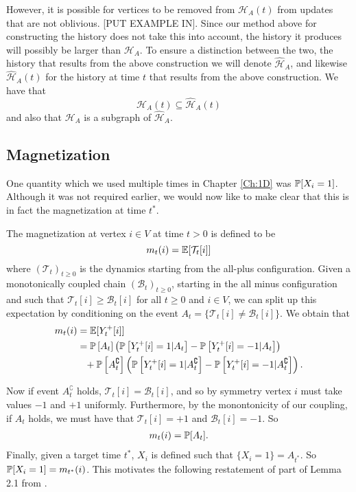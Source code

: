 However, it is possible for vertices to be removed from $\mathcal{H}_A(t)$ from updates that are not oblivious. [PUT EXAMPLE IN]. Since our method above for constructing the history does not take this into account, the history it produces will possibly be larger than $\mathcal{H}_A$. To ensure a distinction between the two, the history that results from the above construction we will denote $\hat{\mathcal{H}}_A$, and likewise $\hat{\mathcal{H}}_A(t)$ for the history at time $t$ that results from the above construction. We have that
\begin{equation}
	\mathcal{H}_A(t) \subseteq \hat{\mathcal{H}}_A(t)
\end{equation}
and also that $\mathcal{H}_A$ is a subgraph of $\hat{\mathcal{H}}_A$.

\subsection{Magnetization}
One quantity which we used multiple times in Chapter \ref{Ch:1D} was $\mathbb{P}[X_i = 1]$. Although it was not required earlier, we would now like to make clear that this is in fact the magnetization at time $t^*$. 

The magnetization at vertex $i \in V$ at time $t > 0$ is defined to be
\begin{equation}
	m_t(i) = \mathbb{E}[\mathcal{T}_t[i]]
\end{equation}
where $(\mathcal{T}_t)_{t \geq 0}$ is the dynamics starting from the all-plus configuration. %
Given a monotonically coupled chain $(\mathcal{B}_t)_{t\geq0}$, starting in the all minus configuration and such that $\mathcal{T}_t[i] \geq \mathcal{B}_t[i]$ for all $t\geq 0$ and $i \in V$, we can split up this expectation by conditioning on the event $A_t = \{\mathcal{T}_t[i] \neq \mathcal{B}_t[i]\}$. We obtain that
\begin{align}
	m_t(i) &= \mathbb{E}[Y_t^+[i]]\\
	&= \mathbb{P}\left[A_t\right] \left(\mathbb{P}\left[Y_t^+[i] = 1 | A_t\right] - \mathbb{P}\left[Y_t^+[i] = -1|A_t\right]\right)  \\
	&\phantom{= } + \mathbb{P}\left[A_t^\complement\right] \left( \mathbb{P}\left[Y_t^+[i] = 1 |A_t^\complement\right] - \mathbb{P}\left[Y_t^+[i] = -1|A_t^\complement\right] \right). \notag
\end{align}

Now if event $A_t^\complement$ holds, $\mathcal{T}_t[i] = \mathcal{B}_t[i]$, and so by symmetry vertex $i$ must take values $-1$ and $+1$ uniformly. Furthermore, by the monontonicity of our coupling, if $A_t$ holds, we must have that $\mathcal{T}_t[i] = +1$ and $\mathcal{B}_t[i] = -1$.
So
\begin{align}
	m_t(i) = \mathbb{P}[A_t].
\end{align}
Finally, given a target time $t^*$, $X_i$ is defined such that $\{X_i = 1\} = A_{t^*}$. So $\mathbb{P}[X_i = 1] = m_{t^*}(i)$. This motivates the following restatement of part of Lemma 2.1 from \cite{Lubetzky2016-wd}.

